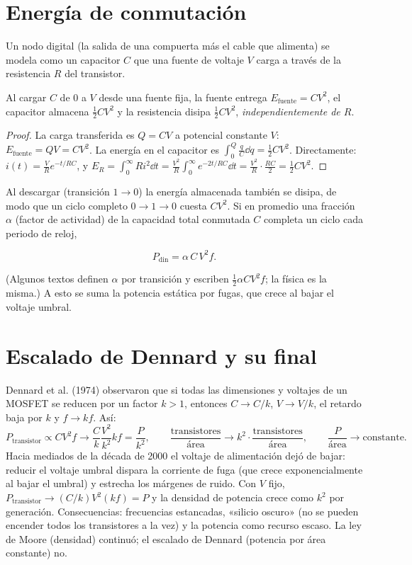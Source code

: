 \documentclass[11pt,a4paper]{article}
\begin{document}
\section{Energía de conmutación}
Un nodo digital (la salida de una compuerta más el cable que alimenta) se modela como un capacitor $C$
que una fuente de voltaje $V$ carga a través de la resistencia $R$ del transistor.
\begin{proposicion}
Al cargar $C$ de $0$ a $V$ desde una fuente fija, la fuente entrega $E_{\text{fuente}}=CV^2$, el capacitor
almacena $\tfrac12CV^2$ y la resistencia disipa $\tfrac12CV^2$, \emph{independientemente de $R$}.
\end{proposicion}
\begin{proof}
La carga transferida es $Q=CV$ a potencial constante $V$: $E_{\text{fuente}}=QV=CV^2$. La energía en el
capacitor es $\int_0^{Q}\frac{q}{C}\dd q=\tfrac12CV^2$. Directamente: $i(t)=\frac VR e^{-t/RC}$, y
$E_R=\int_0^\infty Ri^2\dd t=\frac{V^2}{R}\int_0^\infty e^{-2t/RC}\dd t=\frac{V^2}{R}\cdot\frac{RC}{2}=\tfrac12CV^2$.
\end{proof}
Al descargar (transición $1\to0$) la energía almacenada también se disipa, de modo que un ciclo
completo $0\to1\to0$ cuesta $CV^2$. Si en promedio una fracción $\alpha$ (factor de actividad) de la
capacidad total conmutada $C$ completa un ciclo cada periodo de reloj,
\begin{resultado}
\begin{equation}P_{\text{din}}=\alpha\,C\,V^2 f .\end{equation}
\end{resultado}
\noindent(Algunos textos definen $\alpha$ por transición y escriben $\tfrac12\alpha CV^2f$; la física es la misma.)
A esto se suma la potencia estática por fugas, que crece al bajar el voltaje umbral.

\section{Escalado de Dennard y su final}
Dennard et al. (1974) observaron que si todas las dimensiones y voltajes de un MOSFET se reducen por un
factor $k>1$, entonces $C\to C/k$, $V\to V/k$, el retardo baja por $k$ y $f\to kf$. Así:
\[
P_{\text{transistor}}\propto CV^2f\to \frac{C}{k}\frac{V^2}{k^2}kf=\frac{P}{k^2},\qquad
\frac{\text{transistores}}{\text{área}}\to k^2\cdot\frac{\text{transistores}}{\text{área}},\qquad
\frac{P}{\text{área}}\to\text{constante}.
\]
Hacia mediados de la década de 2000 el voltaje de alimentación dejó de bajar: reducir el voltaje umbral
dispara la corriente de fuga (que crece exponencialmente al bajar el umbral) y estrecha los márgenes de
ruido. Con $V$ fijo, $P_{\text{transistor}}\to(C/k)V^2(kf)=P$ y la densidad de potencia crece como $k^2$
por generación. Consecuencias: frecuencias estancadas, «silicio oscuro» (no se pueden encender todos los
transistores a la vez) y la potencia como recurso escaso. La ley de Moore (densidad) continuó; el
escalado de Dennard (potencia por área constante) no.
\end{document}
